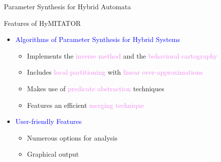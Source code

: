 \documentclass[final]{beamer}
\newcommand{\refer}[1]{\textcolor{blue}{\cite{#1}}}
\newcommand{\couleur}[1]{\textcolor{violet}{#1}}
\newcommand{\coulitem}[1]{\textcolor{blue}{#1}}
\newcommand{\hymitator}{HyMITATOR} %
\begin{document}
\begin{frame}{}
\begin{columns}[t]
\begin{column}{.45\linewidth}
\begin{block}{Parameter Synthesis for Hybrid Automata}
\end{block}    


\begin{block}{Features of \hymitator{}}

\begin{itemize}
	\item \coulitem{Algorithms of Parameter Synthesis for Hybrid Systems}
	\begin{itemize}
		\item Implements the \couleur{inverse method} and the \couleur{behavioral cartography}
		\item Includes \couleur{local partitioning} with \couleur{linear over-approximations}
		\item Makes use of \couleur{predicate abstraction} techniques
		\item Features an efficient \couleur{merging technique}~\refer{afs12}
	\end{itemize}
	
	\vspace{0.5cm}

% 

	\item \coulitem{User-friendly Features}
	\begin{itemize}
		\item Numerous options for analysis
		\item Graphical output


\end{itemize}
\end{itemize}
\end{block}
\end{column}
\end{columns}
\end{frame}
\end{document}
